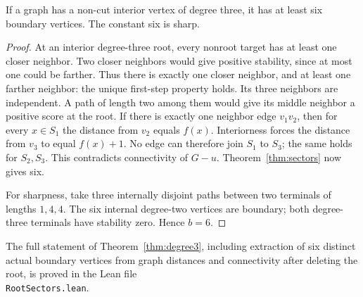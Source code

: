 \begin{theorem}\label{thm:degree3}
If a graph has a non-cut interior vertex of degree three, it has at least
six boundary vertices. The constant six is sharp.
\end{theorem}
\begin{proof}
At an interior degree-three root, every nonroot target has at least one
closer neighbor. Two closer neighbors would give positive stability,
since at most one could be farther. Thus there is exactly one closer
neighbor, and at least one farther neighbor: the unique first-step property
holds.
Its three neighbors are independent. A path of length two among them
would give its middle neighbor a positive score at the root. If there is
exactly one neighbor edge $v_1v_2$, then for every $x\in S_1$ the
distance from $v_2$ equals $f(x)$. Interiorness forces the distance from
$v_3$ to equal $f(x)+1$. No edge can therefore join $S_1$ to $S_3$;
the same holds for $S_2,S_3$. This contradicts connectivity of $G-u$.
Theorem~\ref{thm:sectors} now gives six.

For sharpness, take three internally disjoint paths between two terminals
of lengths $1,4,4$. The six internal degree-two vertices are boundary;
both degree-three terminals have stability zero. Hence $b=6$.
\end{proof}
The full statement of Theorem~\ref{thm:degree3}, including extraction of
six distinct actual boundary vertices from graph distances and connectivity
after deleting the root, is proved in the Lean file\\
\texttt{RootSectors.lean}.

